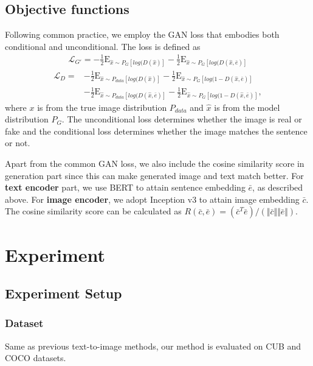 \documentclass{article}
\begin{document}
\subsection{Objective functions}
Following common practice, we employ the GAN loss that embodies both conditional and unconditional. The loss is defined as
\begin{align}
    \mathcal{L}_{G'} = -\frac{1}{2}\mathrm{E}_{\hat{x} \sim P_G [log(D(\hat{x})]} - \frac{1}{2}\mathrm{E}_{\hat{x} \sim P_G [log(D(\hat{x}, \bar{e})]}
\end{align}
\begin{align}
    \mathcal{L}_{D} = &-\frac{1}{2}\mathrm{E}_{\hat{x} \sim P_{data} [log(D(\hat{x})]} - \frac{1}{2}\mathrm{E}_{\hat{x} \sim P_G [log(1 - D(\hat{x}, \bar{e})]} \nonumber \\
    &- \frac{1}{2} \mathrm{E}_{\hat{x} \sim P_{data} [log(D(\hat{x}, \bar{e})]} - \frac{1}{2}\mathrm{E}_{\hat{x} \sim P_G [log(1 - D(\hat{x}, \bar{e})]},
\end{align}
where $x$ is from the true image distribution $P_{data}$ and $\hat{x}$ is from the model distribution $P_G$. The unconditional loss determines whether the image is real or fake and the conditional loss determines whether the image matches the sentence or not.

Apart from the common GAN loss, we also include the cosine similarity score in generation part since this can make generated image and text match better. For \textbf{text encoder} part, we use BERT to attain sentence embedding $\bar{e}$, as described above. For \textbf{image encoder}, we adopt Inception v3\cite{inception} to attain image embedding $\bar{c}$. The cosine similarity score can be calculated as $R(\bar{c}, \bar{e}) = (\bar{c}^T \bar{e})/(\Vert \bar{c} \Vert \Vert \bar{e}\Vert)$.



\section{Experiment}
\subsection{Experiment Setup}
\subsubsection{Dataset}
Same as previous text-to-image methods\cite{attngan,mirrorgan}, our method is evaluated on CUB \cite{WahCUB_200_2011} and COCO\cite{coco} datasets.
\end{document}
